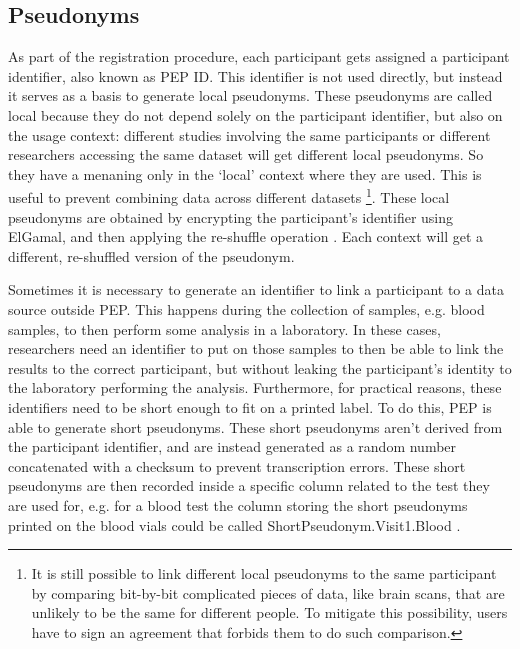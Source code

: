 \documentclass{report}
\begin{document}
\subsection{Pseudonyms}\label{pseudonyms}
As part of the registration procedure, each participant gets assigned a participant identifier, also known as PEP ID. This identifier is not used directly, but instead it serves as a 
basis to generate local pseudonyms. These pseudonyms are called local because they do not depend solely on the participant identifier, but also on the usage context: different studies 
involving the same participants or different researchers accessing the same dataset will get different local pseudonyms. So they have a menaning only in the \enquote*{local} context 
where they are used. This is useful to prevent combining data across different datasets \footnote{It is still possible to link different local pseudonyms to the same participant by 
comparing bit-by-bit complicated pieces of data, like brain scans, that are unlikely to be the same for different people. To mitigate this possibility, users have to sign an agreement 
that forbids them to do such comparison.}. These local pseudonyms are obtained by encrypting the participant's identifier using ElGamal, and then applying the re-shuffle operation
\cite{pep-blueprint}. Each context will get a different, re-shuffled version of the pseudonym.\par
Sometimes it is necessary to generate an identifier to link a participant to a data source outside PEP. This happens during the collection of samples, e.g. blood samples, to then
perform some analysis in a laboratory. In these cases, researchers need an identifier to put on those samples to then be able to link the results to the correct participant, but
without leaking the participant's identity to the laboratory performing the analysis. Furthermore, for practical reasons, these identifiers need to be short enough to fit on a printed label. To do this, PEP is able to generate short
pseudonyms. These short pseudonyms aren't derived from the participant identifier, and are instead generated as a random number concatenated with a checksum to prevent
transcription errors. These short pseudonyms are then recorded inside a specific column related to the test they are used for, e.g. for a blood test the column storing the short
pseudonyms printed on the blood vials could be called ShortPseudonym.Visit1.Blood  \cite{pep-blueprint}.
\end{document}
